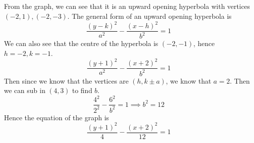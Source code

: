 \documentclass{article}
\begin{document}
\subsection{}
From the graph, we can see that it is an upward opening hyperbola with vertices $(-2,1), (-2,-3)$. The general form of an upward opening hyperbola is 
\[\frac{(y-k)^2}{a^2} - \frac{(x-h)^2}{b^2} = 1\]
We can also see that the centre of the hyperbola is $ (-2,-1)$, hence $ h = -2, k = -1$.
\[\frac{(y+1)^2}{a^2} - \frac{(x+2)^2}{b^2} =1\]
Then since we know that the vertices are $(h, k \pm a)$, we know that $a = 2$. Then we can sub in $(4,3)$ to find $b$.
\[\frac{4^2}{2^2} - \frac{6^2}{b^2} = 1 \implies b^2 = 12\]
Hence the equation of the graph is
\[\frac{(y+1)^2}{4} - \frac{(x+2)^2}{12} = 1\]
\end{document}
